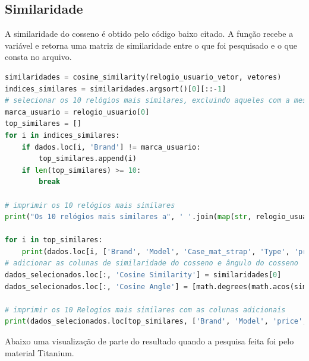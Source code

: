\documentclass[12pt, a4paper]{article}
\begin{document}
\subsection{Similaridade}
A similaridade do cosseno é obtido pelo código baixo citado.
A função recebe a variável e retorna uma matriz de similaridade entre o que foi pesquisado e o que consta no arquivo.

\begin{tcolorbox}[colback=blue!20, colframe=gray!20]
\begin{lstlisting}[language=Python]
similaridades = cosine_similarity(relogio_usuario_vetor, vetores)
indices_similares = similaridades.argsort()[0][::-1]
# selecionar os 10 relógios mais similares, excluindo aqueles com a mesma marca que o exemplo dado
marca_usuario = relogio_usuario[0]
top_similares = []
for i in indices_similares:
    if dados.loc[i, 'Brand'] != marca_usuario:
        top_similares.append(i)
    if len(top_similares) >= 10:
        break

# imprimir os 10 relógios mais similares
print("Os 10 relógios mais similares a", ' '.join(map(str, relogio_usuario)), "são:")

for i in top_similares:
    print(dados.loc[i, ['Brand', 'Model', 'Case_mat_strap', 'Type', 'price']])
# adicionar as colunas de similaridade do cosseno e ângulo do cosseno
dados_selecionados.loc[:, 'Cosine Similarity'] = similaridades[0]
dados_selecionados.loc[:, 'Cosine Angle'] = [math.degrees(math.acos(similarity)) for similarity in similaridades[0]]

# imprimir os 10 Relogios mais similares com as colunas adicionais
print(dados_selecionados.loc[top_similares, ['Brand', 'Model', 'price', 'Cosine Similarity', 'Cosine Angle']])
\end{lstlisting}
\end{tcolorbox}



Abaixo uma visualização de parte do resultado quando a pesquisa feita foi pelo material Titanium.
\end{document}
